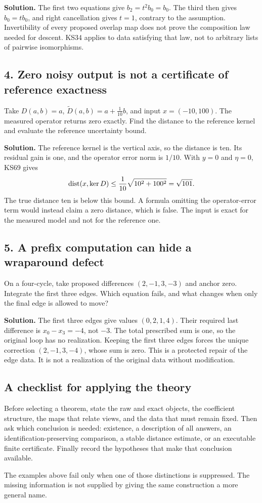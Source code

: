 \textbf{Solution.} The first two equations give \(b_2=t^2b_0=b_0\). The third then gives \(b_0=tb_0\), and right cancellation gives \(t=1\), contrary to the assumption. Invertibility of every proposed overlap map does not prove the composition law needed for descent. KS34 applies to data satisfying that law, not to arbitrary lists of pairwise isomorphisms.

\subsection*{4. Zero noisy output is not a certificate of reference exactness}
Take \(D(a,b)=a\), \(\widetilde D(a,b)=a+\tfrac1{10}b\), and input \(x=(-10,100)\). The measured operator returns zero exactly. Find the distance to the reference kernel and evaluate the reference uncertainty bound.

\textbf{Solution.} The reference kernel is the vertical axis, so the distance is ten. Its residual gain is one, and the operator error norm is \(1/10\). With \(y=0\) and \(\eta=0\), KS69 gives
\[
 \operatorname{dist}(x,\ker D)\le\frac1{10}\sqrt{10^2+100^2}=\sqrt{101}.
\]
The true distance ten is below this bound. A formula omitting the operator-error term would instead claim a zero distance, which is false. The input is exact for the measured model and not for the reference one.

\subsection*{5. A prefix computation can hide a wraparound defect}
On a four-cycle, take proposed differences \((2,-1,3,-3)\) and anchor zero. Integrate the first three edges. Which equation fails, and what changes when only the final edge is allowed to move?

\textbf{Solution.} The first three edges give values \((0,2,1,4)\). Their required last difference is \(x_0-x_3=-4\), not \(-3\). The total prescribed sum is one, so the original loop has no realization. Keeping the first three edges forces the unique correction \((2,-1,3,-4)\), whose sum is zero. This is a protected repair of the edge data. It is not a realization of the original data without modification.

\subsection*{A checklist for applying the theory}
Before selecting a theorem, state the raw and exact objects, the coefficient structure, the maps that relate views, and the data that must remain fixed. Then ask which conclusion is needed: existence, a description of all answers, an identification-preserving comparison, a stable distance estimate, or an executable finite certificate. Finally record the hypotheses that make that conclusion available.

The examples above fail only when one of those distinctions is suppressed. The missing information is not supplied by giving the same construction a more general name.
